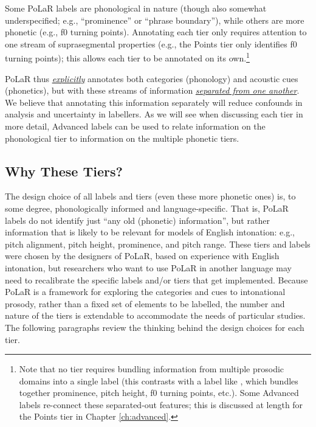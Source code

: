 Some PoLaR labels are phonological in nature (though also somewhat underspecified; e.g., “prominence” or “phrase boundary”), while others are more phonetic (e.g., f0 turning points). Annotating each tier only requires attention to one stream of suprasegmental properties (e.g., the Points tier only identifies f0 turning points); this allows each tier to be annotated on its own.\footnote{Note that no tier requires bundling information from multiple prosodic domains into a single label (this contrasts with a label like , which bundles together prominence, pitch height, f0 turning points, etc.). Some Advanced labels re-connect these separated-out features; this is discussed at length for the Points tier in Chapter \ref{ch:advanced}.\label{fn:no bundling}}

PoLaR thus \textit{\uline{explicitly}} annotates both categories (phonology) and acoustic cues (phonetics), but with these streams of information \textit{\uline{separated from one another}}. We believe that annotating this information separately will reduce confounds in analysis and uncertainty in labellers. As we will see when discussing each tier in more detail, Advanced labels can be used to relate information on the phonological tier to information on the multiple phonetic tiers.

\subsection{Why These Tiers?}\label{sec:why-these-tiers}

The design choice of all labels and tiers (even these more phonetic ones) is, to some degree, phonologically informed and language-specific. That is, PoLaR labels do not identify just “any old (phonetic) information”, but rather information that is likely to be relevant for models of English intonation: e.g., pitch alignment, pitch height, prominence, and pitch range. These tiers and labels were chosen by the designers of PoLaR, based on experience with English intonation, but researchers who want to use PoLaR in another language may need to recalibrate the specific labels and/or tiers that get implemented. Because PoLaR is a framework for exploring the categories and cues to intonational prosody, rather than a fixed set of elements to be labelled, the number and nature of the tiers is extendable to accommodate the needs of particular studies. The following paragraphs review the thinking behind the design choices for each tier.

